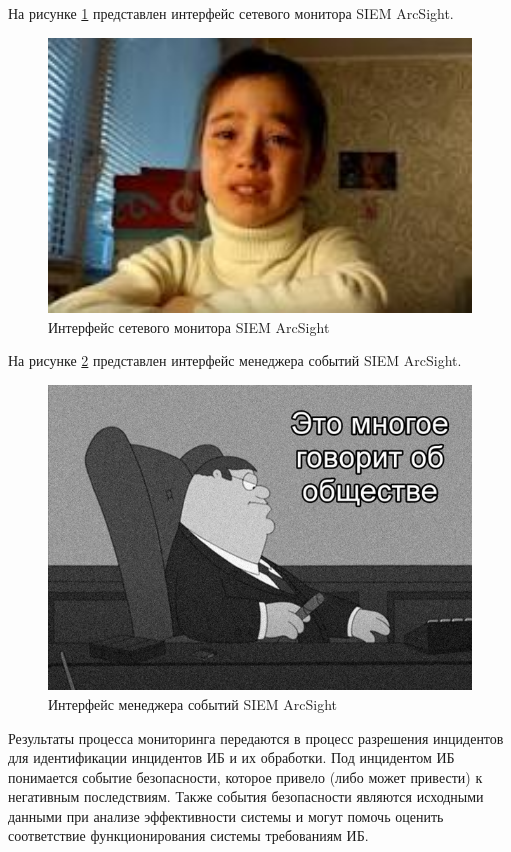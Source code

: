 На рисунке \ref{ArcSight1}  представлен интерфейс сетевого монитора SIEM ArcSight.

\begin{figure}[H]
  \centering
  \includegraphics[width=1\textwidth]{resources/8.jpg}
  \caption{Интерфейс сетевого монитора SIEM ArcSight}
  \label{ArcSight1}
\end{figure}

На рисунке \ref{ArcSight2} представлен интерфейс менеджера событий SIEM ArcSight.


\begin{figure}[H]
  \centering
  \includegraphics[width=1\textwidth]{resources/9.jpg}
  \caption{Интерфейс менеджера событий SIEM ArcSight}
  \label{ArcSight2}
\end{figure}

Результаты процесса мониторинга передаются в процесс разрешения инцидентов для идентификации инцидентов ИБ и их обработки. Под инцидентом ИБ понимается событие безопасности, которое привело (либо может привести) к негативным последствиям. Также события безопасности являются исходными данными при анализе эффективности системы и могут помочь оценить соответствие функционирования системы требованиям ИБ.

